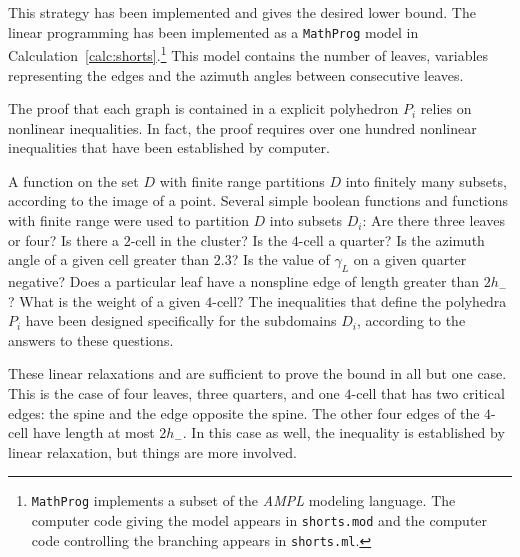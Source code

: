 {This strategy has been implemented and gives the desired lower bound.
The linear programming has been implemented as a {\tt MathProg} model
in Calculation~\ref{calc:shorts}.\footnote{{\tt MathProg} implements a
subset of the {\it AMPL} modeling language.  The computer code
giving the model appears in {\tt shorts.mod} and the computer code
controlling the branching appears in {\tt shorts.ml}.}  This model
contains the number of leaves, variables representing the edges and
the azimuth angles between consecutive leaves.

The proof that each graph is contained in a explicit polyhedron $P_i$
relies on nonlinear inequalities.  In fact, the proof requires over
one hundred nonlinear inequalities that have been established by
computer.

A function on the set $D$ with finite range partitions $D$ into
finitely many subsets, according to the image of a point.  Several
simple boolean functions and functions with finite range were used to
partition $D$ into subsets $D_i$: Are there three leaves or four?  Is
there a $2$-cell in the cluster?  Is the $4$-cell a quarter?  Is the
azimuth angle of a given cell greater than $2.3$?  Is the value of
$\gamma_L$ on a given quarter negative? Does a particular leaf have a
nonspline edge of length greater than $2h_-$?  What is the weight of a
given $4$-cell?  The inequalities that define the polyhedra $P_i$ have
been designed specifically for the subdomains $D_i$, according to the
answers to these questions.

These linear relaxations and are sufficient to prove the bound in all
but one case.  This is the case of four leaves, three quarters, and
one $4$-cell that has two critical edges: the spine and the edge
opposite the spine.  The other four edges of the $4$-cell have length
at most $2h_-$.  In this case as well, the inequality is established
by linear relaxation, but things are more involved.

}

